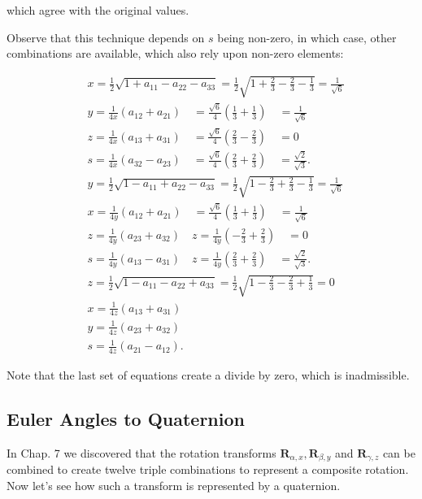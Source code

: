 \documentclass[10pt]{article}
\begin{document}
which agree with the original values.

Observe that this technique depends on $s$ being non-zero, in which case, other combinations are available, which also rely upon non-zero elements:

$$
\begin{aligned}
& x=\frac{1}{2} \sqrt{1+a_{11}-a_{22}-a_{33}}=\frac{1}{2} \sqrt{1+\frac{2}{3}-\frac{2}{3}-\frac{1}{3}}=\frac{1}{\sqrt{6}} \\
& y=\frac{1}{4 x}\left(a_{12}+a_{21}\right) \quad=\frac{\sqrt{6}}{4}\left(\frac{1}{3}+\frac{1}{3}\right) \quad=\frac{1}{\sqrt{6}} \\
& z=\frac{1}{4 x}\left(a_{13}+a_{31}\right) \quad=\frac{\sqrt{6}}{4}\left(\frac{2}{3}-\frac{2}{3}\right) \quad=0 \\
& s=\frac{1}{4 x}\left(a_{32}-a_{23}\right) \quad=\frac{\sqrt{6}}{4}\left(\frac{2}{3}+\frac{2}{3}\right) \quad=\frac{\sqrt{2}}{\sqrt{3}} . \\
& y=\frac{1}{2} \sqrt{1-a_{11}+a_{22}-a_{33}}=\frac{1}{2} \sqrt{1-\frac{2}{3}+\frac{2}{3}-\frac{1}{3}}=\frac{1}{\sqrt{6}} \\
& x=\frac{1}{4 y}\left(a_{12}+a_{21}\right) \quad=\frac{\sqrt{6}}{4}\left(\frac{1}{3}+\frac{1}{3}\right) \quad=\frac{1}{\sqrt{6}} \\
& z=\frac{1}{4 y}\left(a_{23}+a_{32}\right) \quad z=\frac{1}{4 y}\left(-\frac{2}{3}+\frac{2}{3}\right) \quad=0 \\
& s=\frac{1}{4 y}\left(a_{13}-a_{31}\right) \quad z=\frac{1}{4 y}\left(\frac{2}{3}+\frac{2}{3}\right) \quad=\frac{\sqrt{2}}{\sqrt{3}} . \\
& z=\frac{1}{2} \sqrt{1-a_{11}-a_{22}+a_{33}}=\frac{1}{2} \sqrt{1-\frac{2}{3}-\frac{2}{3}+\frac{1}{3}}=0 \\
& x=\frac{1}{4 z}\left(a_{13}+a_{31}\right) \\
& y=\frac{1}{4 z}\left(a_{23}+a_{32}\right) \\
& s=\frac{1}{4 z}\left(a_{21}-a_{12}\right) .
\end{aligned}
$$

Note that the last set of equations create a divide by zero, which is inadmissible.

\subsection{Euler Angles to Quaternion}
In Chap. 7 we discovered that the rotation transforms $\mathbf{R}_{\alpha, x}, \mathbf{R}_{\beta, y}$ and $\mathbf{R}_{\gamma, z}$ can be combined to create twelve triple combinations to represent a composite rotation. Now let's see how such a transform is represented by a quaternion.
\end{document}
